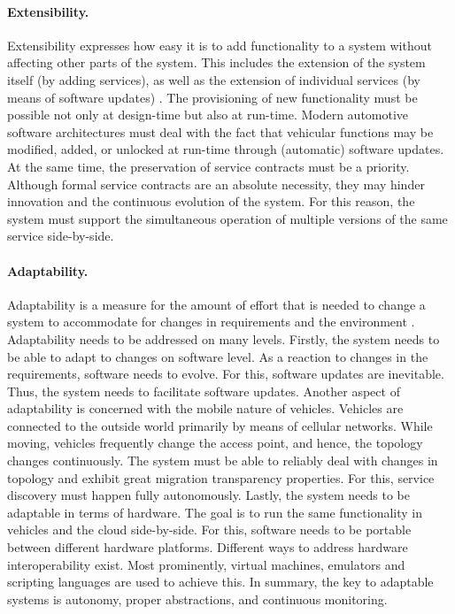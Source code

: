 \paragraph{Extensibility.} 
Extensibility expresses how easy it is to add functionality to a system without affecting other parts of the system. This includes the extension of the system itself (by adding services), as well as the extension of individual services (by means of software updates) \cite{o2007quality}. The provisioning of new functionality must be possible not only at design-time but also at run-time. Modern automotive software architectures must deal with the fact that vehicular functions may be modified, added, or unlocked at run-time through (automatic) software updates. At the same time, the preservation of service contracts must be a priority. Although formal service contracts are an absolute necessity, they may hinder innovation and the continuous evolution of the system. For this reason, the system must support the simultaneous operation of multiple versions of the same service side-by-side.


\paragraph{Adaptability.}
Adaptability is a measure for the amount of effort that is needed to change a system to accommodate for changes in requirements and the environment \cite{o2007quality}. Adaptability needs to be addressed on many levels. Firstly, the system needs to be able to adapt to changes on software level. As a reaction to changes in the requirements, software needs to evolve. For this, software updates are inevitable. Thus, the system needs to facilitate software updates. Another aspect of adaptability is concerned with the mobile nature of vehicles. Vehicles are connected to the outside world primarily by means of cellular networks. While moving, vehicles frequently change the access point, and hence, the topology changes continuously. The system must be able to reliably deal with changes in topology and exhibit great migration transparency properties. For this, service discovery must happen fully autonomously. Lastly, the system needs to be adaptable in terms of hardware. The goal is to run the same functionality in vehicles and the cloud side-by-side. For this, software needs to be portable between different hardware platforms. Different ways to address hardware interoperability exist. Most prominently, virtual machines, emulators and scripting languages are used to achieve this. In summary, the key to adaptable systems is autonomy, proper abstractions, and continuous monitoring.


